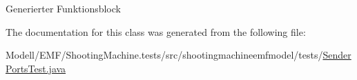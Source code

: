 Generierter Funktionsblock 

The documentation for this class was generated from the following file\-:\begin{DoxyCompactItemize}
\item 
Modell/\-E\-M\-F/\-Shooting\-Machine.\-tests/src/shootingmachineemfmodel/tests/\hyperlink{_sender_ports_test_8java}{Sender\-Ports\-Test.\-java}\end{DoxyCompactItemize}
